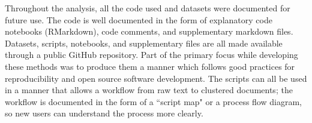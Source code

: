 Throughout the analysis, all the code used and datasets were documented for future use. The code is well documented in the form of explanatory code notebooks (RMarkdown), code comments, and supplementary markdown files. Datasets, scripts, notebooks, and supplementary files are all made available through a public GitHub repository. Part of the primary focus while developing these methods was to produce them a manner which follows good practices for reproducibility and open source software development. The scripts can all be used in a manner that allows a workflow from raw text to clustered documents; the workflow is documented in the form of a ``script map" or a process flow diagram, so new users can understand the process more clearly. 